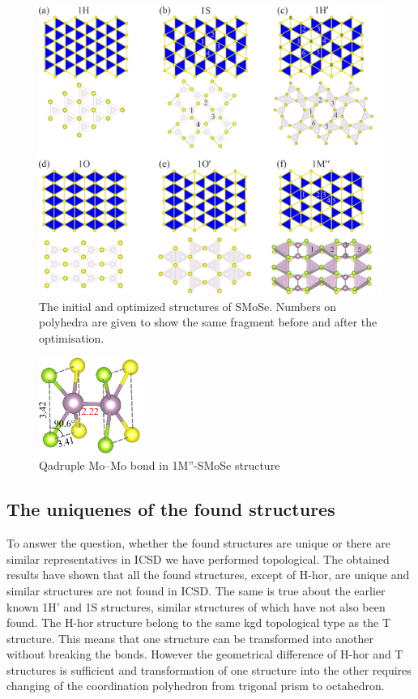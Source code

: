 \documentclass[a4paperm]{article}
\begin{document}
\begin{figure}[H] \centering
        \includegraphics[width=\textwidth]{H-based.png}
        \caption{The initial and optimized structures of SMoSe. Numbers on polyhedra are given to show the same fragment before and after the optimisation.}
\label{H-based}
\end{figure}

\begin{figure}[H]
	\includegraphics[width=0.3\textwidth]{test3_momo.png}
	\caption{Qadruple Mo--Mo bond in 1M''-SMoSe structure}
\label{test3_momo}
\end{figure}








\subsection{The uniquenes of the found structures}

To answer the question, whether the found structures are unique or there are similar representatives in ICSD we have performed topological.
The obtained results have shown that all the found structures, except of H-hor, are unique and similar structures are not found in ICSD.
The same is true about the earlier known 1H' and 1S structures, similar structures of which have not also been found. 
The H-hor structure belong to the same kgd topological type as the T structure.
This means that one structure can be transformed into another without breaking the bonds.
However the geometrical difference of H-hor and T structures is sufficient and transformation of one structure into the other requires changing of the coordination polyhedron from trigonal prism to octahedron.
\end{document}
